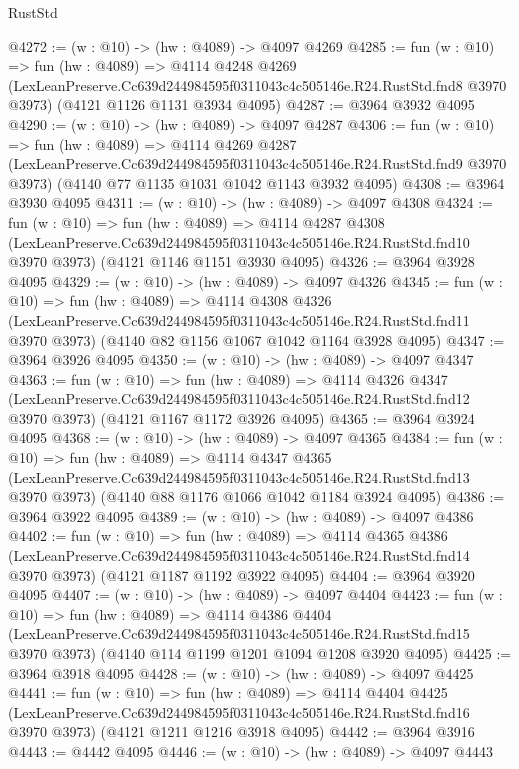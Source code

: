 \begin{lexlean}{RustStd}
\begin{coremodule}
@4272 := (w : @10) -> (hw : @4089) -> @4097 @4269
@4285 := fun (w : @10) =>
  fun (hw : @4089) =>
  @4114
    @4248
    @4269
    (LexLeanPreserve.Cc639d244984595f0311043c4c505146e.R24.RustStd.fnd8 @3970 @3973)
    (@4121 @1126 @1131 @3934 @4095)
@4287 := @3964 @3932 @4095
@4290 := (w : @10) -> (hw : @4089) -> @4097 @4287
@4306 := fun (w : @10) =>
  fun (hw : @4089) =>
  @4114
    @4269
    @4287
    (LexLeanPreserve.Cc639d244984595f0311043c4c505146e.R24.RustStd.fnd9 @3970 @3973)
    (@4140 @77 @1135 @1031 @1042 @1143 @3932 @4095)
@4308 := @3964 @3930 @4095
@4311 := (w : @10) -> (hw : @4089) -> @4097 @4308
@4324 := fun (w : @10) =>
  fun (hw : @4089) =>
  @4114
    @4287
    @4308
    (LexLeanPreserve.Cc639d244984595f0311043c4c505146e.R24.RustStd.fnd10 @3970 @3973)
    (@4121 @1146 @1151 @3930 @4095)
@4326 := @3964 @3928 @4095
@4329 := (w : @10) -> (hw : @4089) -> @4097 @4326
@4345 := fun (w : @10) =>
  fun (hw : @4089) =>
  @4114
    @4308
    @4326
    (LexLeanPreserve.Cc639d244984595f0311043c4c505146e.R24.RustStd.fnd11 @3970 @3973)
    (@4140 @82 @1156 @1067 @1042 @1164 @3928 @4095)
@4347 := @3964 @3926 @4095
@4350 := (w : @10) -> (hw : @4089) -> @4097 @4347
@4363 := fun (w : @10) =>
  fun (hw : @4089) =>
  @4114
    @4326
    @4347
    (LexLeanPreserve.Cc639d244984595f0311043c4c505146e.R24.RustStd.fnd12 @3970 @3973)
    (@4121 @1167 @1172 @3926 @4095)
@4365 := @3964 @3924 @4095
@4368 := (w : @10) -> (hw : @4089) -> @4097 @4365
@4384 := fun (w : @10) =>
  fun (hw : @4089) =>
  @4114
    @4347
    @4365
    (LexLeanPreserve.Cc639d244984595f0311043c4c505146e.R24.RustStd.fnd13 @3970 @3973)
    (@4140 @88 @1176 @1066 @1042 @1184 @3924 @4095)
@4386 := @3964 @3922 @4095
@4389 := (w : @10) -> (hw : @4089) -> @4097 @4386
@4402 := fun (w : @10) =>
  fun (hw : @4089) =>
  @4114
    @4365
    @4386
    (LexLeanPreserve.Cc639d244984595f0311043c4c505146e.R24.RustStd.fnd14 @3970 @3973)
    (@4121 @1187 @1192 @3922 @4095)
@4404 := @3964 @3920 @4095
@4407 := (w : @10) -> (hw : @4089) -> @4097 @4404
@4423 := fun (w : @10) =>
  fun (hw : @4089) =>
  @4114
    @4386
    @4404
    (LexLeanPreserve.Cc639d244984595f0311043c4c505146e.R24.RustStd.fnd15 @3970 @3973)
    (@4140 @114 @1199 @1201 @1094 @1208 @3920 @4095)
@4425 := @3964 @3918 @4095
@4428 := (w : @10) -> (hw : @4089) -> @4097 @4425
@4441 := fun (w : @10) =>
  fun (hw : @4089) =>
  @4114
    @4404
    @4425
    (LexLeanPreserve.Cc639d244984595f0311043c4c505146e.R24.RustStd.fnd16 @3970 @3973)
    (@4121 @1211 @1216 @3918 @4095)
@4442 := @3964 @3916
@4443 := @4442 @4095
@4446 := (w : @10) -> (hw : @4089) -> @4097 @4443

\end{coremodule}
\end{lexlean}
